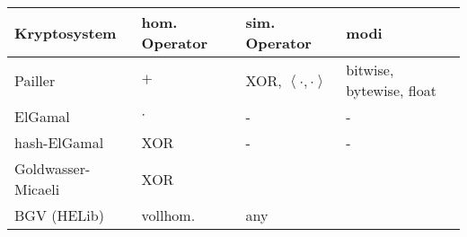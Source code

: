 \begin{center}
	\begin{tabular}{ | l | l | l | p{5cm} |}
		\hline
		Kryptosystem & hom. Operator & sim. Operator & modi \\ \hline
		Pailler & $+$ & XOR, $\left\langle\cdot,\cdot \right\rangle$  & bitwise, bytewise, float \\ \hline
		ElGamal & $\cdot$ & -  & - \\ \hline
		hash-ElGamal & XOR &  - & - \\ \hline
		Goldwasser-Micaeli & XOR & & \\ \hline
		BGV (HELib) & vollhom. & any& \\ \hline
	\end{tabular}
\end{center}